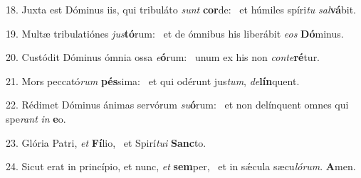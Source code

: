 18. Juxta est Dóminus iis, qui tribuláto \textit{sunt} \textbf{cor}de: \ast\  et húmiles spíri\textit{tu} \textit{sal}\textbf{vá}bit.\

19. Multæ tribulatiónes \textit{jus}\textbf{tó}rum: \ast\  et de ómnibus his liberábit \textit{e}\textit{os} \textbf{Dó}minus.\

20. Custódit Dóminus ómnia ossa \textit{e}\textbf{ó}rum: \ast\  unum ex his non \textit{con}\textit{te}\textbf{ré}tur.\

21. Mors peccató\textit{rum} \textbf{pés}sima: \ast\  et qui odérunt jus\textit{tum}, \textit{de}\textbf{lín}quent.\

22. Rédimet Dóminus ánimas servórum \textit{su}\textbf{ó}rum: \ast\  et non delínquent omnes qui spe\textit{rant} \textit{in} \textbf{e}o.\

23. Glória Patri, \textit{et} \textbf{Fí}lio, \ast\  et Spirí\textit{tu}\textit{i} \textbf{Sanc}to.\

24. Sicut erat in princípio, et nunc, \textit{et} \textbf{sem}per, \ast\  et in sǽcula sæcu\textit{ló}\textit{rum}. \textbf{A}men.\

